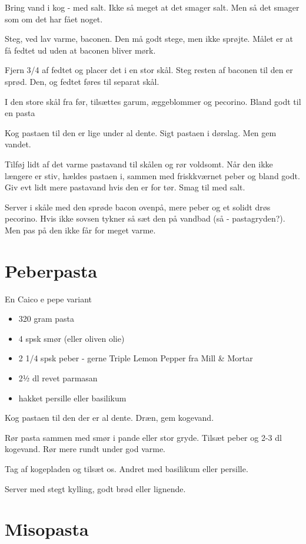 \documentclass[
]{book}
\providecommand{\tightlist}{%
  \setlength{\itemsep}{0pt}\setlength{\parskip}{0pt}}
\begin{document}
Bring vand i kog - med salt. Ikke så meget at det smager salt.
Men så det smager som om det har fået noget.

Steg, ved lav varme, baconen. Den må godt stege, men ikke sprøjte.
Målet er at få fedtet ud uden at baconen bliver mørk.

Fjern 3/4 af fedtet og placer det i en stor skål.
Steg resten af baconen til den er sprød. Den, og fedtet føres til separat skål.

I den store skål fra før, tilsættes garum, æggeblommer og pecorino.
Bland godt til en pasta

Kog pastaen til den er lige under al dente. Sigt pastaen i dørslag.
Men gem vandet.

Tilføj lidt af det varme pastavand til skålen og rør voldsomt.
Når den ikke længere er stiv, hældes pastaen i, sammen med friskkværnet
peber og bland godt. Giv evt lidt mere pastavand hvis den er for tør.
Smag til med salt.

Server i skåle med den sprøde bacon ovenpå, mere peber og et solidt
drøs pecorino.
Hvis ikke sovsen tykner så sæt den på vandbad (så - pastagryden?).
Men pas på den ikke får for meget varme.

\hypertarget{peberpasta}{%
\section{Peberpasta}\label{peberpasta}}

En Caico e pepe variant

\begin{itemize}
\tightlist
\item
  320 gram pasta
\item
  4 spsk smør (eller oliven olie)
\item
  2 1/4 spsk peber - gerne Triple Lemon Pepper fra Mill \& Mortar
\item
  2½ dl revet parmasan
\item
  hakket persille eller basilikum
\end{itemize}

Kog pastaen til den der er al dente. Dræn, gem kogevand.

Rør pasta sammen med smør i pande eller stor gryde. Tilsæt peber og 2-3 dl
kogevand. Rør mere rundt under god varme.

Tag af kogepladen og tilsæt os. Andret med basilikum eller persille.

Server med stegt kylling, godt brød eller lignende.

\hypertarget{misopasta}{%
\section{Misopasta}\label{misopasta}}
\end{document}
